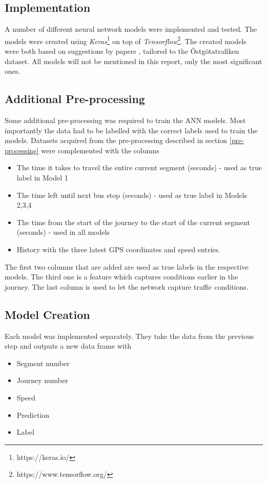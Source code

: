 \subsection{Implementation}
A number of different neural network models were implemented and tested. The models were created using \textit{Keras}\footnote{https://keras.io/} on top of \textit{Tensorflow}\footnote{https://www.tensorflow.org/}. The created models were both based on suggestions by papers \cite{brazilANN,RNNBusPredictions}, tailored to the Östgötatrafiken dataset. All models will not be mentioned in this report, only the most significant ones.

\subsection{Additional Pre-processing}
Some additional pre-processing was required to train the ANN models. Most importantly the data had to be labelled with the correct labels used to train the models. Datasets acquired from the pre-processing described in section \ref{pre-processing} were complemented with the columns

\begin{itemize}
	\item The time it takes to travel the entire current segment (seconds) - used as true label in Model 1
	\item The time left until next bus stop (seconds) - used as true label in Models 2,3,4
	\item The time from the start of the journey to the start of the current segment (seconds) - used in all models
	\item History with the three latest GPS coordinates and speed entries.
\end{itemize}

\noindent The first two columns that are added are used as true labels in the respective models. The third one is a feature which captures conditions earlier in the journey. The last column is used to let the network capture traffic conditions.

\subsection{Model Creation}
Each model was implemented separately. They take the data from the previous step and outputs a new data frame with 

\begin{itemize}
	\item Segment number
	\item Journey number
	\item Speed
	\item Prediction
	\item Label
\end{itemize}

